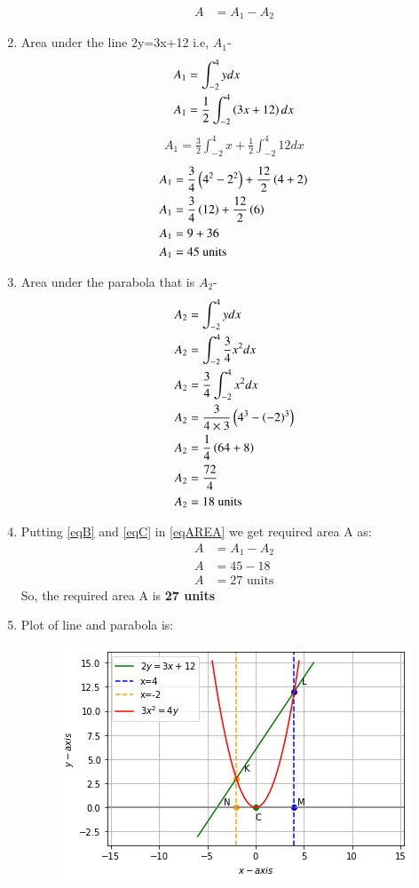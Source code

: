 \documentclass[journal,12pt,twocolumn]{IEEEtran}
\begin{document}
\begin{enumerate}
\begin{align}
    A&= A_1 -A_2 \label{eqAREA}
    \end{align}
\item Area under the line 2y=3x+12 i.e, $A_1$-
\begin{align}
  A_1&= \int_{-2}^{4} y dx
    \\
    A_1&= \frac{1}{2}\int_{-2}^{4} \left(3x+12\right) dx
    \end{align}
    \begin{align}
    A_1= \frac{3}{2}\int_{-2}^{4} x+\frac{1}{2}\int_{-2}^{4}12 dx
    \end{align}
    \begin{align}
    A_1&= \frac{3}{4}\left(4^2-2^2\right) +\frac{12}{2}\left(4+2\right)
   \\
    A_1&= \frac{3}{4}\left(12\right) +\frac{12}{2}\left(6\right)
    \\
    A_1&= 9 +36
    \\
    A_1 &=45 \text{ units} \label{eqB}
\end{align}
\item Area under the parabola that is $A_2$-
\begin{align}
    A_2&= \int_{-2}^{4} y dx
    \\
    A_2&= \int_{-2}^{4} \frac{3}{4} x^2 dx
    \\
    A_2&= \frac{3}{4} \int_{-2}^{4}  x^2 dx
    \\
    A_2&= \frac{3}{4\times3} \left(4^3-\left(-2\right)^3\right)
    \\
    A_2&= \frac{1}{4} \left(64 +8\right)
    \\
    A_2&= \frac{72}{4} 
    \\
    A_2&= 18 \text{ units} \label{eqC}
\end{align}
\item Putting \eqref{eqB} and \eqref{eqC} in \eqref{eqAREA} we get required area A as:
\begin{align}
 A &= A_1 -A_2 
 \\
 A &= 45-18
 \\
 A &= 27 \text{ units}
\end{align}
So, the required area A is \textbf{27 units}
\item Plot of line and parabola is:
\begin{figure}[ht]
\centering
\includegraphics[width=\columnwidth]{LINE AND PARABOLA.png}

\end{figure}
\end{enumerate}
\end{document}
